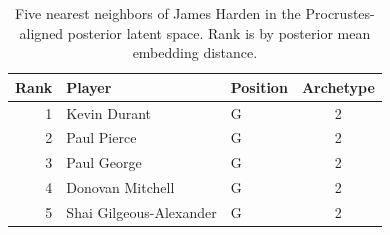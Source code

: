 \begin{table}[htbp]
  \centering\small
  \begin{tabular}{rllc}
    \toprule
    Rank & Player & Position & Archetype \\
    \midrule
    1 & Kevin Durant & G & 2 \\
    2 & Paul Pierce & G & 2 \\
    3 & Paul George & G & 2 \\
    4 & Donovan Mitchell & G & 2 \\
    5 & Shai Gilgeous-Alexander & G & 2 \\
    \bottomrule
  \end{tabular}
  \caption{Five nearest neighbors of James Harden in the Procrustes-aligned posterior latent space. Rank is by posterior mean embedding distance.}
\end{table}

